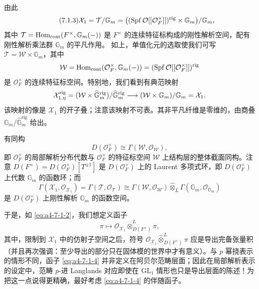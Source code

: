 由此
\begin{equation}\tag{7.1.3}\label{eq:a4-7-1-3}
\mathcal X_1=\mathcal T/\mathbb G_m
=\bigl((\operatorname{Spf}\mathcal O[[\mathcal O_F^\times]])^{\mathrm{rig}}\times\mathbb G_m\bigr)/\mathbb G_m,
\end{equation}
其中 $\mathcal T=\operatorname{Hom}_{\mathrm{cont}}(F^\times,\mathbb G_m(-))$ 是 $F^\times$ 的连续特征标构成的刚性解析空间，配有刚性解析乘法群 $\mathbb G_m$ 的平凡作用。 如上，单值化元的选取使我们可写 $\mathcal T=\mathcal W\times\mathbb G_m$，其中
\[
\mathcal W=\operatorname{Hom}_{\mathrm{cont}}(\mathcal O_F^\times,\mathbb G_m(-))
=(\operatorname{Spf}\mathcal O[[\mathcal O_F^\times]])^{\mathrm{rig}}
\]
是 $\mathcal O_F^\times$ 的连续特征标空间。特别地，我们看到有典范映射
\[
\mathcal X_{1,\eta}^{\mathrm{rig}}
=(\mathcal W\times\widehat{\mathbb G}_m^{\mathrm{rig}})/\widehat{\mathbb G}_m^{\mathrm{rig}}
\longrightarrow(\mathcal W\times\mathbb G_m)/\mathbb G_m=\mathcal X_1.
\]
该映射的像是 $\mathcal X_1$ 的开子叠；注意该映射不可表。其非平凡纤维是零维的，由商叠 $\mathbb G_m/\widehat{\mathbb G}_m^{\mathrm{rig}}$ 给出。

有同构
\[
D(\mathcal O_F^\times)\cong\Gamma(\mathcal W,\mathcal O_{\mathcal W}),
\]
即 $\mathcal O_F^\times$ 的局部解析分布代数与 $\mathcal O_F^\times$ 的特征标空间 $\mathcal W$ 上结构层的整体截面同构。注意 $D(F^\times)=D(\mathcal O_F^\times)[T^{\pm1}]$ 是 $D(\mathcal O_F^\times)$ 上的 Laurent 多项式环，即 $D(\mathcal O_F^\times)$ 上代数 $\mathbb G_m$ 的函数环；而
\[
\Gamma(\mathcal X_1,\mathcal O_{\mathcal X_1})=\Gamma(\mathcal T,\mathcal O_{\mathcal T})
\cong\Gamma(\mathcal W,\mathcal O_{\mathcal W})\widehat\otimes_L\Gamma(\mathbb G_m,\mathcal O_{\mathbb G_m})
\]
是 $D(\mathcal O_F^\times)$ 上刚性解析 $\mathbb G_m$ 的函数空间。

于是，如 \eqref{eq:a4-7-1-2}，我们想定义函子
\begin{equation}\tag{7.1.4}\label{eq:a4-7-1-4}
\pi\mapsto\mathcal O_{\mathcal X_1}\widehat\otimes^{L}_{D(F^\times)}\pi,
\end{equation}
其中，限制到 $\mathcal X_1$ 中的仿射子空间之后，符号 $\mathcal O_{\mathcal X_1}\widehat\otimes^{L}_{D(F^\times)}\pi$ 应是导出完备张量积（并且再次强调：至少导出的部分只在固体模的世界中才有意义）。与 $p$ 幂挠表示的情形不同，函子 \eqref{eq:a4-7-1-4} 并非定义在阿贝尔范畴层面；因此在局部解析表示的设定中，范畴 $p$-进 Langlands 对应即使在 $\mathrm{GL}_1$ 情形也只是导出层面的陈述！为把这一点说得更精确，最好考虑 \eqref{eq:a4-7-1-4} 的伴随函子。

